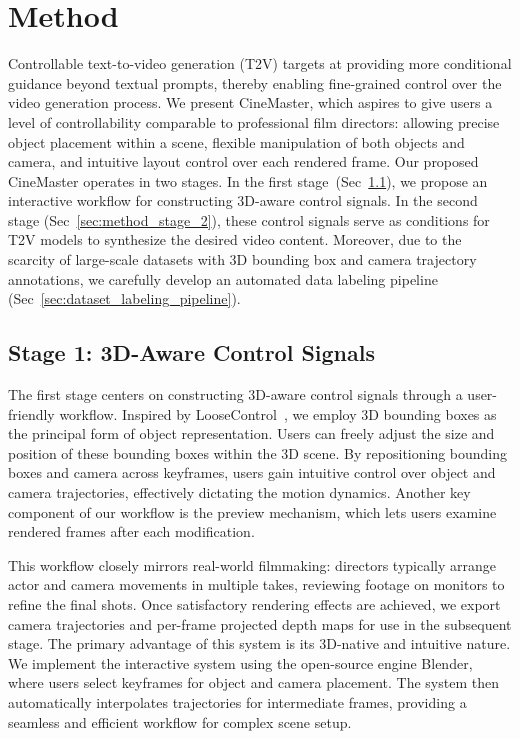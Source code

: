 

\section{Method}
Controllable text-to-video generation (T2V) targets at providing more conditional guidance beyond textual prompts, thereby enabling fine-grained control over the video generation process. We present CineMaster, which aspires to give users a level of controllability comparable to professional film directors: allowing precise object placement within a scene, flexible manipulation of both objects and camera, and intuitive layout control over each rendered frame. Our proposed CineMaster operates in two stages. In the first stage~(Sec~\ref{sec:method_stage_1}), we propose an interactive workflow for constructing 3D-aware control signals. In the second stage (Sec~\ref{sec:method_stage_2}), these control signals serve as conditions for T2V models to synthesize the desired video content. Moreover, due to the scarcity of large-scale datasets with 3D bounding box and camera trajectory annotations, we carefully develop an automated data labeling pipeline (Sec~\ref{sec:dataset_labeling_pipeline}).


\subsection{Stage 1: 3D-Aware Control Signals}
\label{sec:method_stage_1}
The first stage centers on constructing 3D-aware control signals through a user-friendly workflow. Inspired by LooseControl~\cite{bhat2024loosecontrol}, we employ 3D bounding boxes as the principal form of object representation. Users can freely adjust the size and position of these bounding boxes within the 3D scene. By repositioning bounding boxes and camera across keyframes, users gain intuitive control over object and camera trajectories, effectively dictating the motion dynamics. Another key component of our workflow is the preview mechanism, which lets users examine rendered frames after each modification.


This workflow closely mirrors real-world filmmaking: directors typically arrange actor and camera movements in multiple takes, reviewing footage on monitors to refine the final shots. Once satisfactory rendering effects are achieved, we export camera trajectories and per-frame projected depth maps for use in the subsequent stage. The primary advantage of this system is its 3D-native and intuitive nature. We implement the interactive system using the open-source engine Blender, where users select keyframes for object and camera placement. The system then automatically interpolates trajectories for intermediate frames, providing a seamless and efficient workflow for complex scene setup.


